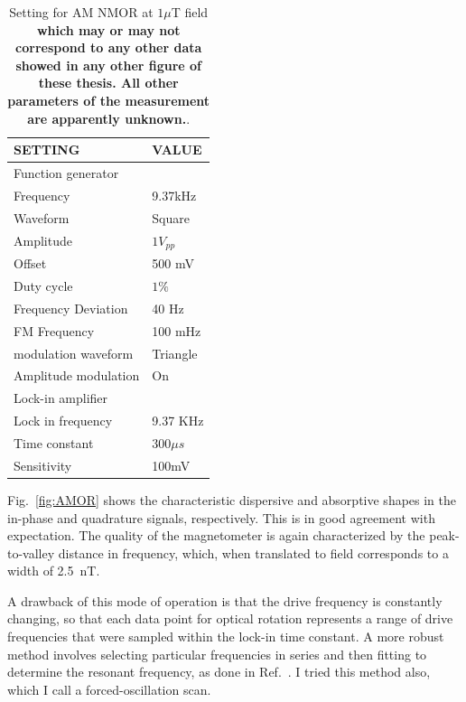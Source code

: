 \begin{table}%
\centering
\begin{tabular}{|l |l|}
\hline

\textbf{ SETTING}    & \textbf{VALUE} \\
\hline
Function generator &   \\
\hline
Frequency & 9.37kHz   \\

Waveform    &  Square  \\

Amplitude   &  $1V_{pp}$  \\
Offset  &       500 mV  \\
Duty cycle       &    $1\%$ \\
Frequency Deviation     &   40 Hz  \\
FM Frequency     &   100 mHz  \\
modulation waveform      &    Triangle \\
Amplitude modulation & On \\
\hline
Lock-in amplifier &     \\
\hline
Lock in frequency     & 9.37 KHz \\
Time constant     &  $300\mu s$ \\
Sensitivity      &  100mV  \\
\hline
\end{tabular}
\caption{Setting for AM NMOR at $1\mu$T field {\bf which may or may
    not correspond to any other data showed in any other figure of
    these thesis.  All other parameters of the measurement are
    apparently unknown.}.\label{tab:freqsweep}}
\end{table}

Fig.~\ref{fig:AMOR} shows the characteristic dispersive and absorptive
shapes in the in-phase and quadrature signals, respectively.  This is
in good agreement with expectation.  The quality of the magnetometer
is again characterized by the peak-to-valley distance in frequency,
which, when translated to field corresponds to a width of 2.5~nT.

A drawback of this mode of operation is that the drive frequency is
constantly changing, so that each data point for optical rotation
represents a range of drive frequencies that were sampled within the
lock-in time constant.  A more robust method involves selecting
particular frequencies in series and then fitting to determine the
resonant frequency, as done in Ref.~\cite{mythesis}.  I tried
this method also, which I call a forced-oscillation scan.

